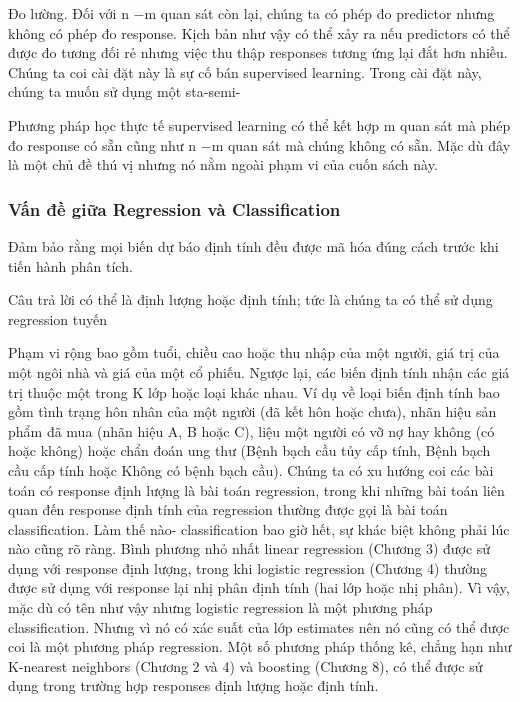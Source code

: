 Đo lường. Đối với n −m quan sát còn lại, chúng ta có phép đo predictor nhưng không có phép đo response. Kịch bản như vậy có thể xảy ra nếu predictors có thể được đo tương đối rẻ nhưng việc thu thập responses tương ứng lại đắt hơn nhiều. Chúng ta coi cài đặt này là sự cố bán supervised learning. Trong cài đặt này, chúng ta muốn sử dụng một sta-semi-

Phương pháp học thực tế supervised learning có thể kết hợp m quan sát mà phép đo response có sẵn cũng như n −m quan sát mà chúng không có sẵn. Mặc dù đây là một chủ đề thú vị nhưng nó nằm ngoài phạm vi của cuốn sách này.

\subsubsection{Vấn đề giữa Regression và Classification}

Đảm bảo rằng mọi biến dự báo định tính đều được mã hóa đúng cách trước khi tiến hành phân tích.

Câu trả lời có thể là định lượng hoặc định tính; tức là chúng ta có thể sử dụng regression tuyến

Phạm vi rộng bao gồm tuổi, chiều cao hoặc thu nhập của một người, giá trị của một ngôi nhà và giá của một cổ phiếu. Ngược lại, các biến định tính nhận các giá trị thuộc một trong K lớp hoặc loại khác nhau. Ví dụ về loại biến định tính bao gồm tình trạng hôn nhân của một người (đã kết hôn hoặc chưa), nhãn hiệu sản phẩm đã mua (nhãn hiệu A, B hoặc C), liệu một người có vỡ nợ hay không (có hoặc không) hoặc chẩn đoán ung thư (Bệnh bạch cầu tủy cấp tính, Bệnh bạch cầu cấp tính hoặc Không có bệnh bạch cầu). Chúng ta có xu hướng coi các bài toán có response định lượng là bài toán regression, trong khi những bài toán liên quan đến response định tính của regression thường được gọi là bài toán classification. Làm thế nào- classification bao giờ hết, sự khác biệt không phải lúc nào cũng rõ ràng. Bình phương nhỏ nhất linear regression (Chương 3) được sử dụng với response định lượng, trong khi logistic regression (Chương 4) thường được sử dụng với response lại nhị phân định tính (hai lớp hoặc nhị phân). Vì vậy, mặc dù có tên như vậy nhưng logistic regression là một phương pháp classification. Nhưng vì nó có xác suất của lớp estimates nên nó cũng có thể được coi là một phương pháp regression. Một số phương pháp thống kê, chẳng hạn như K-nearest neighbors (Chương 2 và 4) và boosting (Chương 8), có thể được sử dụng trong trường hợp responses định lượng hoặc định tính.

